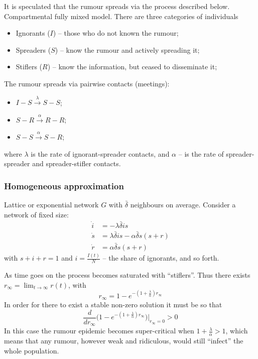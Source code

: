 \documentclass[a4paper]{article}
\begin{document}
It is speculated that the rumour spreads via the process described below.
Compartmental fully mixed model. There are three categories of individuals
\begin{itemize}
	\item Ignorants ($I$) -- those who do not known the rumour;
	\item Spreaders ($S$) -- know the rumour and actively spreading it;
	\item Stiflers ($R$) -- know the information, but ceased to disseminate it;
\end{itemize}
The rumour spreads via pairwise contacts (meetings): \begin{itemize}
	\item $I-S \overset{\lambda}{\to} S-S$;
	\item $S-R \overset{\alpha}{\to} R-R$;
	\item $S-S \overset{\alpha}{\to} S-R$;
\end{itemize}
where $\lambda$ is the rate of ignorant-spreader contacts, and $\alpha$ -- is the 
rate of spreader-spreader and spreader-stifler contacts.

\subsubsection{Homogeneous approximation} %
\label{ssub:homogeneous_approximation}

Lattice or exponential network $G$ with $\bar{\delta}$ neighbours on average.
Consider a network of fixed size:
\begin{align*}
	\dot{i} &= - \lambda \bar{\delta} i s\\
	\dot{s} &= \lambda \bar{\delta} i s - \alpha \bar{\delta} s (s + r)\\
	\dot{r} &= \alpha \bar{\delta} s (s + r)
\end{align*}
with $s+i+r = 1$ and $i = \frac{I(t)}{N}$ -- the share of ignorants, and so forth.

As time goes on the process becomes saturated with ``stiflers''. Thus there exists
$r_\infty = \lim_{t\to \infty} r(t)$, with
\[r_\infty = 1 - e^{-(1+\frac{\lambda}{\alpha})r_\infty}\]
In order for there to exist a stable non-zero solution it must be so that
\[
\frac{d}{d r_\infty} \bigl(
	1 - e^{-(1+\frac{\lambda}{\alpha}) r_\infty}
\bigr)\rvert_{r_\infty = 0} > 0
\]
In this case the rumour epidemic becomes super-critical when $1+\frac{\lambda}{\alpha}>1$,
which means that any rumour, however weak and ridiculous, would still ``infect'' the whole
population.
\end{document}
